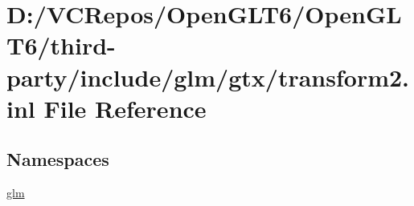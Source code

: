 \hypertarget{transform2_8inl}{}\section{D\+:/\+V\+C\+Repos/\+Open\+G\+L\+T6/\+Open\+G\+L\+T6/third-\/party/include/glm/gtx/transform2.inl File Reference}
\label{transform2_8inl}
\subsection*{Namespaces}
\begin{DoxyCompactItemize}
\item 
 \mbox{\hyperlink{namespaceglm}{glm}}
\end{DoxyCompactItemize}
